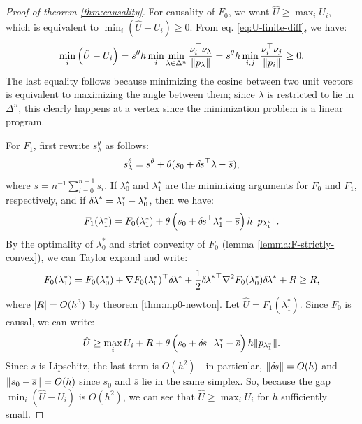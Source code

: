 \documentclass[smallcondensed]{svjour3}
\begin{document}
\begin{proof}[Proof of theorem \ref{thm:causality}]
  For causality of $F_0$, we want $\hat{U} \geq \max_i U_i$, which is
  equivalent to $\min_i(\hat{U} - U_i) \geq 0$. From eq.\@
  \ref{eq:U-finite-diff}, we have:
  \begin{equation}
    \min_i \left(\hat{U} - U_i\right) = s^\theta h \min_i \min_{\lambda \in \Delta^n} \frac{\nu_i^\top \nu_{\lambda}}{\left\|p_\lambda\right\|} = s^\theta h \min_{i, j} \frac{\nu_i^\top \nu_j}{\left\|p_i\right\|} \geq 0.
  \end{equation}
  The last equality follows because minimizing the cosine between two
  unit vectors is equivalent to maximizing the angle between them;
  since $\lambda$ is restricted to lie in $\Delta^n$, this clearly
  happens at a vertex since the minimization problem is a linear
  program.

  For $F_1$, first rewrite $s_\lambda^\theta$ as follows:
  \begin{equation}
    s_\lambda^\theta = s^\theta + \theta (s_0 + {\delta \hspace{-0.1em} s}^\top \lambda - \overline{s}),
  \end{equation}
  where $\overline{s} = n^{-1} \sum_{i=0}^{n-1} s_i$. If
  $\lambda_0^\star$ and $\lambda_1^\star$ are the minimizing arguments
  for $F_0$ and $F_1$, respectively, and if
  ${\delta \hspace{-0.1em} \lambda}^* = \lambda_1^* - \lambda_0^*$, then we have:
  \begin{equation}\label{eq:F1-in-terms-of-F0}
    F_1(\lambda_1^*) = F_0(\lambda_1^*) + \theta \left(s_0 + {\delta \hspace{-0.1em} s}^\top \lambda_1^* - \overline{s}\right) h \|p_{\lambda_1^\star}\|.
  \end{equation}
  By the optimality of $\lambda_0^*$ and strict convexity of
  $F_0$ (lemma \ref{lemma:F-strictly-convex}), we can Taylor
  expand and write:
  \begin{equation}
    F_0(\lambda_1^*) = F_0(\lambda_0^*) + \nabla F_0(\lambda_0^*)^\top {\delta \hspace{-0.1em} \lambda}^* + \frac{1}{2} {{\delta \hspace{-0.1em} \lambda}^*}^\top \nabla^2 F_0(\lambda_0^*) {\delta \hspace{-0.1em} \lambda}^* + R \geq R,
  \end{equation}
  where $\left|R\right| = O(h^3)$ by theorem \ref{thm:mp0-newton}. Let
  $\hat{U} = F_1(\lambda_1^*)$. Since $F_0$ is causal,
  we can write:
  \begin{equation}
    \hat{U} \geq \max_i U_i + R + \theta \left(s_0 + {\delta \hspace{-0.1em} s}^\top \lambda_1^* - \overline{s}\right) h \|p_{\lambda_1^*}\|.
  \end{equation}
  Since $s$ is Lipschitz, the last term is $O(h^2)$---in particular,
  $\left\|{\delta \hspace{-0.1em} s}\right\| = O(h)$ and $\left\|s_0 - \overline{s}\right\| = O(h)$ since
  $s_0$ and $\overline{s}$ lie in the same simplex. So, because the
  gap $\min_i(\hat{U} - U_i)$ is $O(h^2)$, we can see that
  $\hat{U} \geq \max_i U_i$ for $h$ sufficiently small.
\end{proof}


{}
\end{document}
